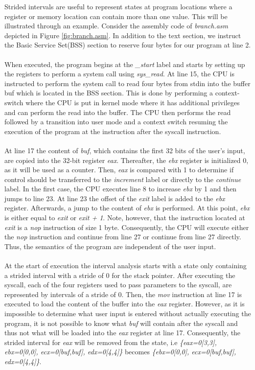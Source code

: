 \documentclass{kththesis}
\renewcommand{\it}[1]{\textit{#1}}
\begin{document}
\clearpage
\noindent
Strided intervals are useful to represent states at program locations where a register or memory location can contain more than one value. This will be illustrated through an example. Consider the assembly code of \it{branch.asm} depicted in Figure \ref{fig:branch.asm}. In addition to the text section, we instruct the Basic Service Set(BSS) section to reserve four bytes for our program at line 2. 
\\ \\
When executed, the program begins at the \it{\_start} label and starts by setting up the registers to perform a system call using \it{sys\_read}. At line 15, the CPU is instructed to perform the system call to read four bytes from stdin into the buffer buf which is located in the BSS section. This is done by performing a context-switch where the CPU is put in kernel mode where it has additional privileges and can perform the read into the buffer. The CPU then performs the read followed by a transition into user mode and a context switch resuming the execution of the program at the instruction after the syscall instruction.
\\ \\ 
At line 17 the content of \it{buf}, which contains the first 32 bits of the user's input, are copied into the 32-bit register \it{eax}. Thereafter, the \it{ebx} register is initialized 0, as it will be used as a counter. Then, \it{eax} is compared with 1 to determine if control should be transferred to the \it{increment} label or directly to the \it{continue} label. In the first case, the CPU executes line 8 to increase \it{ebx} by 1 and then jumps to line 23. At line 23 the offset of the \it{exit} label is added to the \it{ebx} register. Afterwards, a jump to the content of \it{ebx} is performed. At this point, \it{ebx} is either equal to \it{exit} or \it{exit + 1}. Note, however, that the instruction located at \it{exit} is a \it{nop} instruction of size 1 byte. Consequently, the CPU will execute either the \it{nop} instruction and continue from line 27 or continue from line 27 directly. Thus, the semantics of the program are independent of the user input. 
\\ \\
At the start of execution the interval analysis starts with a state only containing a strided interval with a stride of 0 for the stack pointer. After executing the syscall, each of the four registers used to pass parameters to the syscall, are represented by intervals of a stride of 0. Then, the \it{mov} instruction at line 17 is executed to load the content of the buffer into the \it{eax} register. However, as it is impossible to determine what user input is entered without actually executing the program, it is not possible to know what \it{buf} will contain after the syscall and thus not what will be loaded into the \it{eax} register at line 17. Consequently, the strided interval for \it{eax} will be removed from the state, i.e \it{\{eax=0[3,3], ebx=0[0,0], ecx=0[buf,buf], edx=0[4,4]\}} becomes \it{\{ebx=0[0,0], ecx=0[buf,buf], edx=0[4,4]\}}.
\end{document}

